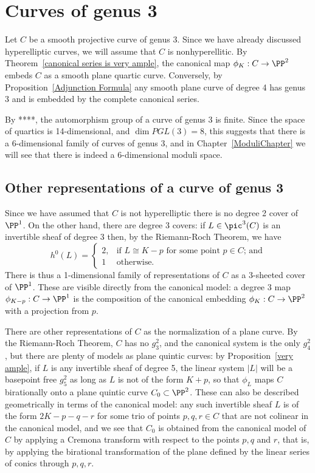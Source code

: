 \section{Curves of genus 3}

Let $C$ be a smooth projective curve of genus 3. Since we have already discussed hyperelliptic curves, 
we will assume  that $C$ is nonhyperellitic. By  Theorem~\ref{canonical series is very ample}, the canonical map $\phi_K : C \to \PP^2$ embeds $C$ as a smooth plane quartic curve. Conversely, by Proposition~\ref{Adjunction Formula} any smooth plane curve of degree 4 has genus 3 and is embedded by the complete canonical series. 

By ****, the automorphism group of a curve of genus 3 is finite. Since the space of quartics is 14-dimensional, and $\dim PGL(3) = 8$, this suggests that
there is a 6-dimensional family of curves of genus 3, and in Chapter~\ref{ModuliChapter}
we will see that there is indeed a 6-dimensional moduli space.

\subsection{Other representations of a curve of genus 3}
Since we have assumed that $C$ is not hyperelliptic there is no degree 2 cover of $\PP^1$. On the other hand, there are degree 3 covers: if $L \in \pic^3(C)$ is an invertible sheaf of degree 3 then, by the Riemann-Roch Theorem, we have
$$
h^0(L) = 
\begin{cases}
2, &\text{if $L \cong K-p$ for some point $p \in C$; and} \\
1 &\text{otherwise.}
\end{cases}
$$
There is thus a 1-dimensional family of representations of $C$ as a 3-sheeted cover of $\PP^1$. These are  visible directly from the canonical model: a degree 3 map $\phi_{K-p} : C \to \PP^1$ is the composition of the canonical embedding $\phi_K : C \to \PP^2$ with a projection from $p$. 

There are other representations of $C$ as the normalization of a plane curve. By the Riemann-Roch Theorem, $C$ has no $g^2_3$, and the canonical system is the only $g^2_4$, but there are plenty of models as plane quintic curves: by Proposition~\ref{very ample}, if $L$ is any invertible sheaf of degree 5, the linear system $|L|$ will be a basepoint free $g^2_5$ as long as $L$ is not of the form $K+p$, so that $\phi_L$ maps $C$ birationally onto a plane quintic curve $C_0 \subset \PP^2$. These can also be described geometrically in terms of the canonical model: any such invertible sheaf $L$ is of the form $2K-p-q-r$ for some trio of  points $p, q, r \in C$ that are not colinear in the canonical model, and we see  that $C_0$ is obtained from the canonical model of $C$ by applying a Cremona transform with respect to the points $p, q$ and $r$, that is, by applying the birational transformation
of the plane defined by the linear series of conics through $p,q,r$.

